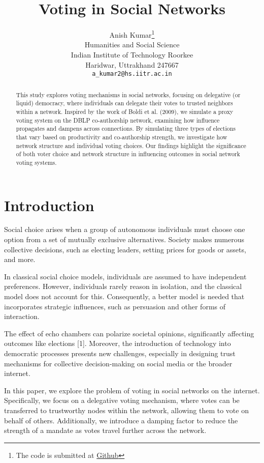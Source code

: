 \documentclass{article} %
\title{Voting in Social Networks}
\author{
Anish Kumar\thanks{ The code is submitted at \href{https://github.com/theanishk/Networks-Project.git}{Github}} \\
Humanities and Social Science\\
Indian Institute of Technology Roorkee\\
Haridwar, Uttrakhand 247667 \\
\texttt{a\_kumar2@hs.iitr.ac.in}
}
\begin{document}
\maketitle

\begin{abstract}
This study explores voting mechanisms in social networks, focusing on delegative (or liquid) democracy, where individuals can delegate their votes to trusted neighbors within a network. Inspired by the work of Boldi et al. (2009), we simulate a proxy voting system on the DBLP co-authorship network, examining how influence propagates and dampens across connections. By simulating three types of elections that vary based on productivity and co-authorship strength, we investigate how network structure and individual voting choices. Our findings highlight the significance of both voter choice and network structure in influencing outcomes in social network voting systems.
\end{abstract}

\section{Introduction}
Social choice arises when a group of autonomous individuals must choose one option from a set of mutually exclusive alternatives. Society makes numerous collective decisions, such as electing leaders, setting prices for goods or assets, and more.

In classical social choice models, individuals are assumed to have independent preferences. However, individuals rarely reason in isolation, and the classical model does not account for this. Consequently, a better model is needed that incorporates strategic influences, such as persuasion and other forms of interaction.

The effect of echo chambers can polarize societal opinions, significantly affecting outcomes like elections [1]. Moreover, the introduction of technology into democratic processes presents new challenges, especially in designing trust mechanisms for collective decision-making on social media or the broader internet.

In this paper, we explore the problem of voting in social networks on the internet. Specifically, we focus on a delegative voting mechanism, where votes can be transferred to trustworthy nodes within the network, allowing them to vote on behalf of others. Additionally, we introduce a damping factor to reduce the strength of a mandate as votes travel further across the network.
\end{document}
